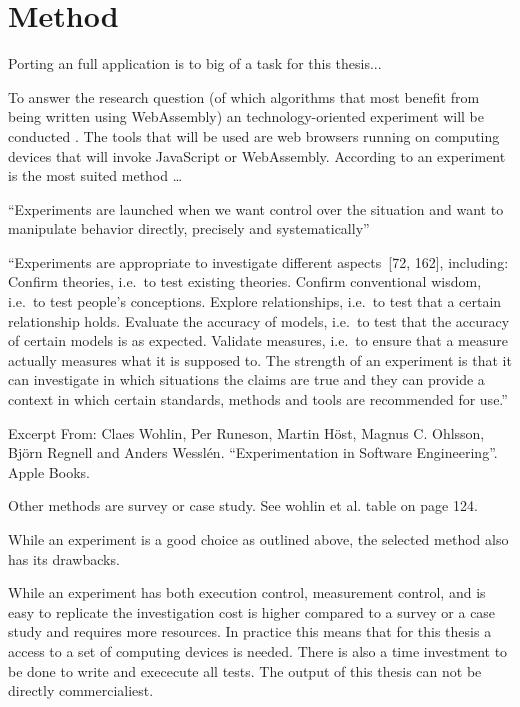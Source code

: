\section{Method}
\label{method}

Porting an full application is to big of a task for this thesis...


To answer the research question (of which algorithms that most benefit from being written using WebAssembly) an technology-oriented experiment will be conducted \parencite{WohlinRunesonHostOhlssonRegnellWesslen2012}. The tools that will be used are web browsers running on computing devices that will invoke JavaScript or WebAssembly. According to \textcite{WohlinRunesonHostOhlssonRegnellWesslen2012} an experiment is the most suited method …

“Experiments are launched when we want control over the situation and want to manipulate behavior directly, precisely and systematically”

“Experiments are appropriate to investigate different aspects [72, 162], including:
Confirm theories, i.e. to test existing theories.
Confirm conventional wisdom, i.e. to test people’s conceptions.
Explore relationships, i.e. to test that a certain relationship holds.
Evaluate the accuracy of models, i.e. to test that the accuracy of certain models is as expected.
Validate measures, i.e. to ensure that a measure actually measures what it is supposed to.
The strength of an experiment is that it can investigate in which situations the claims are true and they can provide a context in which certain standards, methods and tools are recommended for use.”

Excerpt From: Claes Wohlin, Per Runeson, Martin Höst, Magnus C. Ohlsson, Björn Regnell and Anders Wesslén. “Experimentation in Software Engineering”. Apple Books. 


Other methods are survey or case study. See wohlin et al.
table on page 124.

While an experiment is a good choice as outlined above, the selected method also has its drawbacks.

While an experiment has both execution control, measurement control, and is easy to replicate the investigation cost is higher compared to a survey or a case study and requires more resources. In practice this means that for this thesis a access to a set of computing devices is needed. There is also a time investment to be done to write and exececute all tests. The output of this thesis can not be directly commercialiest. \parencite{WohlinRunesonHostOhlssonRegnellWesslen2012}

